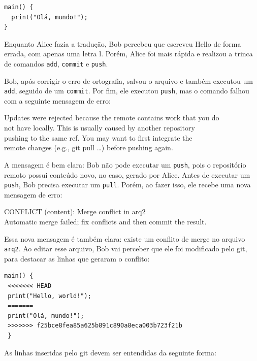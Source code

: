 \documentclass[
  11pt,
  twoside]{book}
\newcommand{\passthrough}[1]{#1}
\begin{document}
\begin{lstlisting}
main() {
  print("Olá, mundo!");
}
\end{lstlisting}

Enquanto Alice fazia a tradução, Bob percebeu que escreveu Hello de
forma errada, com apenas uma letra l. Porém, Alice foi mais rápida e
realizou a trinca de comandos \passthrough{\lstinline!add!},
\passthrough{\lstinline!commit!} e \passthrough{\lstinline!push!}.

Bob, após corrigir o erro de ortografia, salvou o arquivo e também
executou um \passthrough{\lstinline!add!}, seguido de um
\passthrough{\lstinline!commit!}. Por fim, ele executou
\passthrough{\lstinline!push!}, mas o comando falhou com a seguinte
mensagem de erro:

Updates were rejected because the remote contains work that you do\\
not have locally. This is usually caused by another repository\\
pushing to the same ref. You may want to first integrate the\\
remote changes (e.g., git pull \ldots) before pushing again.

A mensagem é bem clara: Bob não pode executar um
\passthrough{\lstinline!push!}, pois o repositório remoto possui
conteúdo novo, no caso, gerado por Alice. Antes de executar um
\passthrough{\lstinline!push!}, Bob precisa executar um
\passthrough{\lstinline!pull!}. Porém, ao fazer isso, ele recebe uma
nova mensagem de erro:

CONFLICT (content): Merge conflict in arq2\\
Automatic merge failed; fix conflicts and then commit the result.

Essa nova mensagem é também clara: existe um conflito de merge no
arquivo \passthrough{\lstinline!arq2!}. Ao editar esse arquivo, Bob vai
perceber que ele foi modificado pelo git, para destacar as linhas que
geraram o conflito:

\begin{lstlisting}
main() {                                                
 <<<<<<< HEAD                                     
 print("Hello, world!");                               
 =======                                                 
 print("Olá, mundo!");                                 
 >>>>>>> f25bce8fea85a625b891c890a8eca003b723f21b 
 }                                                       
\end{lstlisting}

As linhas inseridas pelo git devem ser entendidas da seguinte forma:
\end{document}
